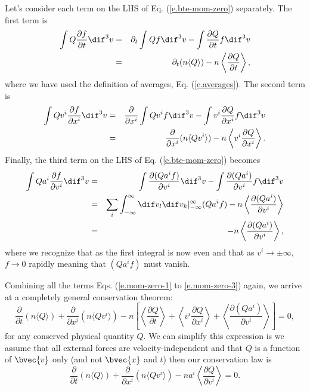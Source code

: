 Let's consider each term on the LHS of Eq. (\ref{e.bte-mom-zero}) separately. The first term is
\begin{eqnarray}
  \int Q \frac{\partial f}{\partial t} \dif^3v &=& \partial_t \int Qf\dif^3v - \int \frac{\partial Q}{\partial t} f \dif^3 v \nonumber \\
  &=& \partial_t (n\langle Q \rangle) - n\left\langle\frac{\partial Q}{\partial t}\right\rangle, \label{e.mom-zero-1}
\end{eqnarray}
where we have used the definition of averages, Eq. (\ref{e.averages}).
The second term is
\begin{eqnarray}
  \int Q v^i\frac{\partial f}{\partial x^i} \dif^3v &=& \frac{\partial}{\partial x^i} \int Qv^if\dif^3v - \int v^i\frac{\partial Q}{\partial x^i}f\dif^3v \nonumber \\
  &=& \frac{\partial}{\partial x^i} (n\langle Qv^i\rangle) - n\left\langle v^i \frac{\partial Q}{\partial x^i}\right\rangle. \label{e.mom-zero-2}
\end{eqnarray}
Finally, the third term on the LHS of Eq. (\ref{e.bte-mom-zero}) becomes
\begin{eqnarray}
    \int Qa^i\frac{\partial f}{\partial v^i}\dif^3v &=& \int \frac{\partial (Q a^i f)}{\partial v^i} \dif^3v - \int \frac{\partial (Qa^i)}{\partial v^i} f\dif^3v \nonumber \\
    &=& \sum_i \int_{-\infty}^\infty \dif v_l \dif v_k \vert_{-\infty}^{\infty} (Qa^if) - n\left\langle\frac{\partial(Qa^i)}{\partial v^i}\right\rangle \nonumber \\
    &=& -n\left\langle\frac{\partial(Qa^i)}{\partial v^i}\right\rangle, \label{e.mom-zero-3}
\end{eqnarray}
where we recognize that as the first integral is now even and that as $v^i\rightarrow \pm\infty$, $f\rightarrow0$ rapidly meaning that $(Qa^if)$ must vanish.

Combining all the terms Eqs. (\ref{e.mom-zero-1} to \ref{e.mom-zero-3}) again, we arrive at a completely general conservation theorem:
\begin{equation}
  \frac{\partial}{\partial t} (n\langle Q \rangle) + \frac{\partial}{\partial x^i} (n\langle Qv^i\rangle) - n\left[ \left\langle\frac{\partial Q}{\partial t}\right\rangle + \left\langle v^i \frac{\partial Q}{\partial x^i}\right\rangle + \left\langle\frac{\partial(Qa^i)}{\partial v^i}\right\rangle \right] = 0,
\end{equation}
for any conserved physical quantity $Q$.
We can simplify this expression is we assume that all external forces are velocity-independent and that $Q$ is a function of $\bvec{v}$ only (and not $\bvec{x}$ and $t$) then our conservation law is
\begin{equation}
  \frac{\partial}{\partial t} (n\langle Q \rangle) + \frac{\partial}{\partial x^i} (n\langle Qv^i\rangle) - na^i\left\langle\frac{\partial Q}{\partial v^i}\right\rangle = 0.\label{e.conservation}
\end{equation}

